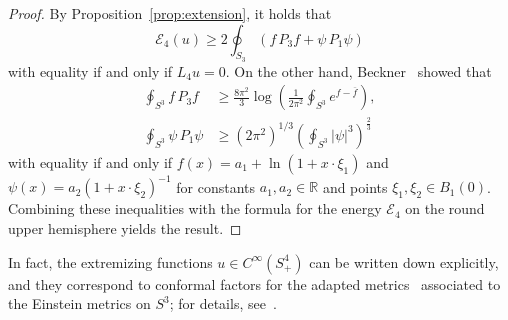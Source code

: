 \documentclass{amsart}
\theoremstyle{definition}
\theoremstyle{remark}
\numberwithin{equation}{section}
\begin{document}
\begin{proof}
 By Proposition~\ref{prop:extension}, it holds that
 \[ {\mathcal{E}}_4(u) \geq 2\oint_{S_3} \left(f\,P_3f + \psi\,P_1\psi\right) \]
 with equality if and only if $L_4u=0$.  On the other hand, Beckner~\cite{Beckner1993} showed that
 \begin{align*}
  \oint_{S^3} f\,P_3f & \geq \frac{8\pi^2}{3}\log\left(\frac{1}{2\pi^2}\oint_{S^3} e^{f-{\overline{f}}}\right), \\
  \oint_{S^3} \psi\,P_1\psi & \geq \left(2\pi^2\right)^{1/3}\left(\oint_{S^3} {\lvert}\psi{\rvert}^3\right)^{\frac{2}{3}}
 \end{align*}
 with equality if and only if $f(x)=a_1+\ln(1+x\cdot\xi_1)$ and $\psi(x)=a_2(1+x\cdot\xi_2)^{-1}$ for constants $a_1,a_2\in{\mathbb{R}}$ and points $\xi_1,\xi_2\in B_1(0)$. Combining these inequalities with the formula for the energy ${\mathcal{E}}_4$ on the round upper hemisphere yields the result.
\end{proof}

In fact, the extremizing functions $u\in C^\infty(S_+^4)$ can be written down explicitly, and they correspond to conformal factors for the adapted metrics~\cite{CaseChang2013} associated to the Einstein metrics on $S^3$; for details, see~\cite{AcheChang2015}.



\end{document}
